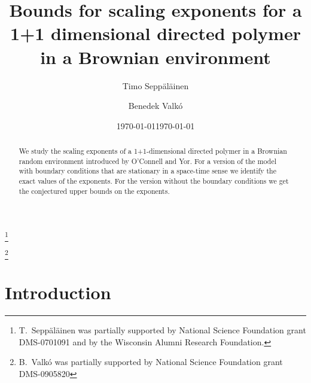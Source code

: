\documentclass[11pt]{amsart}
\title[Polymer in a Brownian environment]{Bounds for scaling exponents for a 1+1 dimensional directed polymer in a Brownian environment}
\date{\today}
\numberwithin{equation}{section}
\theoremstyle{remark}
\begin{document}
\author[T.~Sepp\"al\"ainen]{Timo Sepp\"al\"ainen}
\address{Timo Sepp\"al\"ainen\\ University of Wisconsin-Madison\\ 
Mathematics Department\\ Van Vleck Hall\\ 480 Lincoln Dr.\\  
Madison WI 53706-1388\\ USA.}
\thanks{T.~Sepp\"al\"ainen was partially supported by 
National Science Foundation grant DMS-0701091 and by the
Wisconsin Alumni Research Foundation.} 
\author[B.~Valk\'o]{Benedek Valk\'o}
\address{Benedek Valk\'o\\ University of Wisconsin-Madison\\ 
Mathematics Department\\ Van Vleck Hall\\ 480 Lincoln Dr.\\  
Madison WI 53706-1388\\ USA.}
\thanks{B.~Valk\'o  was partially supported by 
National Science Foundation grant DMS-0905820} 

\date{\today}
\begin{abstract} 
We study the scaling exponents of a  1+1-dimensional directed polymer in a Brownian  random
environment      introduced by O'Connell and  Yor.   For a version of the model with
  boundary conditions that are stationary in a space-time  sense we identify the
exact values of the exponents.  For the version without the boundary conditions we
get the conjectured upper bounds on the exponents.  
\end{abstract}
\maketitle

\section{Introduction}
\end{document}
